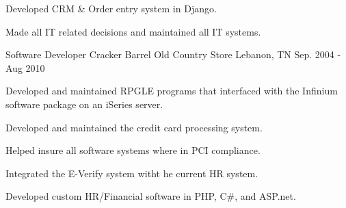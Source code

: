 \begin{cventries}
{\begin{cvitems}
        \item {Developed CRM \& Order entry system in Django.}
        \item {Made all IT related decisions and maintained all IT systems.}
      \end{cvitems} 
    }
  \cventry
    {Software Developer}
    {Cracker Barrel Old Country Store}
    {Lebanon, TN}
    {Sep. 2004 - Aug 2010}
    {
      \begin{cvitems}
        \item {Developed and maintained RPGLE programs that interfaced with the Infinium software package on an iSeries server.}
        \item {Developed and maintained the credit card processing system.}
        \item {Helped insure all software systems where in PCI compliance.}
        \item {Integrated the E-Verify system witht he current HR system.}
        \item {Developed custom HR/Financial software in PHP, C\#, and ASP.net.}
      \end{cvitems}
    }
\end{cventries}
